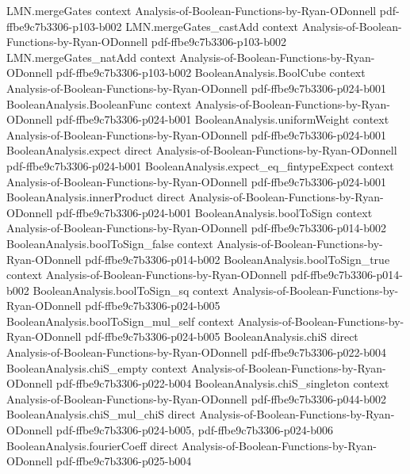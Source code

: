 \begin{theorem}
\proofstep
  {LMN.mergeGates}
  {context}
  {Analysis-of-Boolean-Functions-by-Ryan-ODonnell}
  {pdf-ffbe9c7b3306-p103-b002}
\proofstep
  {LMN.mergeGates_castAdd}
  {context}
  {Analysis-of-Boolean-Functions-by-Ryan-ODonnell}
  {pdf-ffbe9c7b3306-p103-b002}
\proofstep
  {LMN.mergeGates_natAdd}
  {context}
  {Analysis-of-Boolean-Functions-by-Ryan-ODonnell}
  {pdf-ffbe9c7b3306-p103-b002}
\proofstep
  {BooleanAnalysis.BoolCube}
  {context}
  {Analysis-of-Boolean-Functions-by-Ryan-ODonnell}
  {pdf-ffbe9c7b3306-p024-b001}
\proofstep
  {BooleanAnalysis.BooleanFunc}
  {context}
  {Analysis-of-Boolean-Functions-by-Ryan-ODonnell}
  {pdf-ffbe9c7b3306-p024-b001}
\proofstep
  {BooleanAnalysis.uniformWeight}
  {context}
  {Analysis-of-Boolean-Functions-by-Ryan-ODonnell}
  {pdf-ffbe9c7b3306-p024-b001}
\proofstep
  {BooleanAnalysis.expect}
  {direct}
  {Analysis-of-Boolean-Functions-by-Ryan-ODonnell}
  {pdf-ffbe9c7b3306-p024-b001}
\proofstep
  {BooleanAnalysis.expect_eq_fintypeExpect}
  {context}
  {Analysis-of-Boolean-Functions-by-Ryan-ODonnell}
  {pdf-ffbe9c7b3306-p024-b001}
\proofstep
  {BooleanAnalysis.innerProduct}
  {direct}
  {Analysis-of-Boolean-Functions-by-Ryan-ODonnell}
  {pdf-ffbe9c7b3306-p024-b001}
\proofstep
  {BooleanAnalysis.boolToSign}
  {context}
  {Analysis-of-Boolean-Functions-by-Ryan-ODonnell}
  {pdf-ffbe9c7b3306-p014-b002}
\proofstep
  {BooleanAnalysis.boolToSign_false}
  {context}
  {Analysis-of-Boolean-Functions-by-Ryan-ODonnell}
  {pdf-ffbe9c7b3306-p014-b002}
\proofstep
  {BooleanAnalysis.boolToSign_true}
  {context}
  {Analysis-of-Boolean-Functions-by-Ryan-ODonnell}
  {pdf-ffbe9c7b3306-p014-b002}
\proofstep
  {BooleanAnalysis.boolToSign_sq}
  {context}
  {Analysis-of-Boolean-Functions-by-Ryan-ODonnell}
  {pdf-ffbe9c7b3306-p024-b005}
\proofstep
  {BooleanAnalysis.boolToSign_mul_self}
  {context}
  {Analysis-of-Boolean-Functions-by-Ryan-ODonnell}
  {pdf-ffbe9c7b3306-p024-b005}
\proofstep
  {BooleanAnalysis.chiS}
  {direct}
  {Analysis-of-Boolean-Functions-by-Ryan-ODonnell}
  {pdf-ffbe9c7b3306-p022-b004}
\proofstep
  {BooleanAnalysis.chiS_empty}
  {context}
  {Analysis-of-Boolean-Functions-by-Ryan-ODonnell}
  {pdf-ffbe9c7b3306-p022-b004}
\proofstep
  {BooleanAnalysis.chiS_singleton}
  {context}
  {Analysis-of-Boolean-Functions-by-Ryan-ODonnell}
  {pdf-ffbe9c7b3306-p044-b002}
\proofstep
  {BooleanAnalysis.chiS_mul_chiS}
  {direct}
  {Analysis-of-Boolean-Functions-by-Ryan-ODonnell}
  {pdf-ffbe9c7b3306-p024-b005,
    pdf-ffbe9c7b3306-p024-b006}
\proofstep
  {BooleanAnalysis.fourierCoeff}
  {direct}
  {Analysis-of-Boolean-Functions-by-Ryan-ODonnell}
  {pdf-ffbe9c7b3306-p025-b004}

\end{theorem}
